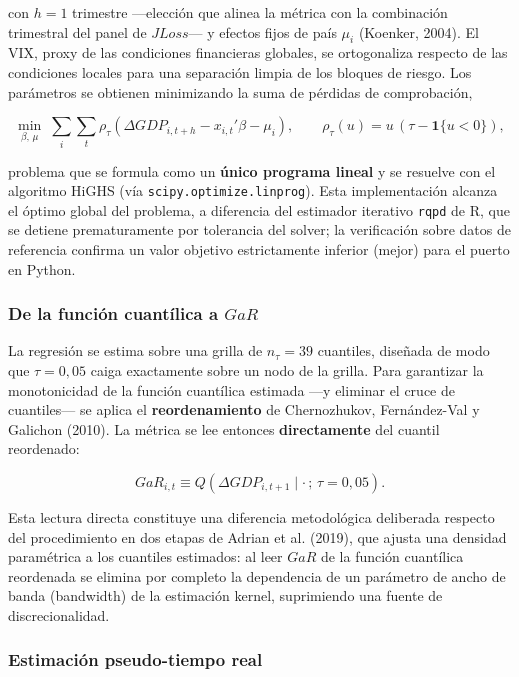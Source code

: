 \documentclass[5p,times,twocolumn,authoryear]{elsarticle}
\begin{document}
con $h = 1$ trimestre —elección que alinea la métrica con la combinación trimestral del panel de $JLoss$— y efectos fijos de país $\mu_i$ (Koenker, 2004). El VIX, proxy de las condiciones financieras globales, se ortogonaliza respecto de las condiciones locales para una separación limpia de los bloques de riesgo. Los parámetros se obtienen minimizando la suma de pérdidas de comprobación,

\[ \min_{\beta,\,\mu}\;\sum_{i}\sum_{t}\rho_\tau\!\left(\Delta GDP_{i,t+h} - x_{i,t}'\beta - \mu_i\right), \qquad \rho_\tau(u) = u\,(\tau - \mathbf{1}\{u<0\}), \]

problema que se formula como un \textbf{único programa lineal} y se resuelve con el algoritmo HiGHS (vía \texttt{scipy.optimize.linprog}). Esta implementación alcanza el óptimo global del problema, a diferencia del estimador iterativo \texttt{rqpd} de R, que se detiene prematuramente por tolerancia del solver; la verificación sobre datos de referencia confirma un valor objetivo estrictamente inferior (mejor) para el puerto en Python.

\subsubsection{De la función cuantílica a $GaR$}

La regresión se estima sobre una grilla de $n_\tau = 39$ cuantiles, diseñada de modo que $\tau = 0{,}05$ caiga exactamente sobre un nodo de la grilla. Para garantizar la monotonicidad de la función cuantílica estimada —y eliminar el cruce de cuantiles— se aplica el \textbf{reordenamiento} de Chernozhukov, Fernández-Val y Galichon (2010). La métrica se lee entonces \textbf{directamente} del cuantil reordenado:

\[ GaR_{i,t} \equiv Q\!\left(\Delta GDP_{i,t+1}\mid \cdot\,;\,\tau = 0{,}05\right). \]

Esta lectura directa constituye una diferencia metodológica deliberada respecto del procedimiento en dos etapas de Adrian et al. (2019), que ajusta una densidad paramétrica a los cuantiles estimados: al leer $GaR$ de la función cuantílica reordenada se elimina por completo la dependencia de un parámetro de ancho de banda (bandwidth) de la estimación kernel, suprimiendo una fuente de discrecionalidad.

\subsubsection{Estimación pseudo-tiempo real}
\end{document}

